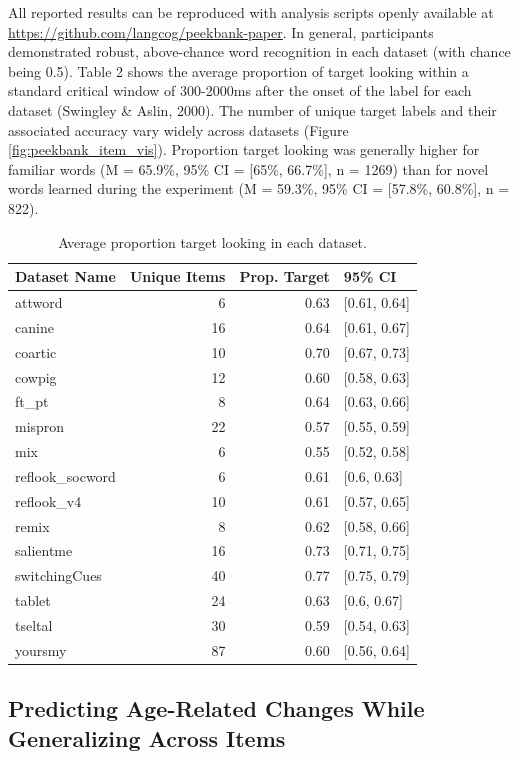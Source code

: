 \documentclass[10pt, letterpaper]{article}
\begin{document}
All reported results can be reproduced with analysis scripts openly
available at \url{https://github.com/langcog/peekbank-paper}. In
general, participants demonstrated robust, above-chance word recognition
in each dataset (with chance being 0.5). Table 2 shows the average
proportion of target looking within a standard critical window of
300-2000ms after the onset of the label for each dataset (Swingley \&
Aslin, 2000). The number of unique target labels and their associated
accuracy vary widely across datasets (Figure
\ref{fig:peekbank_item_vis}). Proportion target looking was generally
higher for familiar words (M = 65.9\%, 95\% CI = {[}65\%, 66.7\%{]}, n =
1269) than for novel words learned during the experiment (M = 59.3\%,
95\% CI = {[}57.8\%, 60.8\%{]}, n = 822).

\begin{table}[H]
\centering
\begingroup\fontsize{9pt}{10pt}\selectfont
\begin{tabular}{lrrl}
  \hline
Dataset Name & Unique Items & Prop. Target & 95\% CI \\ 
  \hline
attword & 6 & 0.63 & [0.61, 0.64] \\ 
  canine & 16 & 0.64 & [0.61, 0.67] \\ 
  coartic & 10 & 0.70 & [0.67, 0.73] \\ 
  cowpig & 12 & 0.60 & [0.58, 0.63] \\ 
  ft\_pt & 8 & 0.64 & [0.63, 0.66] \\ 
  mispron & 22 & 0.57 & [0.55, 0.59] \\ 
  mix & 6 & 0.55 & [0.52, 0.58] \\ 
  reflook\_socword & 6 & 0.61 & [0.6, 0.63] \\ 
  reflook\_v4 & 10 & 0.61 & [0.57, 0.65] \\ 
  remix & 8 & 0.62 & [0.58, 0.66] \\ 
  salientme & 16 & 0.73 & [0.71, 0.75] \\ 
  switchingCues & 40 & 0.77 & [0.75, 0.79] \\ 
  tablet & 24 & 0.63 & [0.6, 0.67] \\ 
  tseltal & 30 & 0.59 & [0.54, 0.63] \\ 
  yoursmy & 87 & 0.60 & [0.56, 0.64] \\ 
   \hline
\end{tabular}
\endgroup
\caption{Average proportion target looking in each dataset.} 
\end{table}

\hypertarget{predicting-age-related-changes-while-generalizing-across-items}{%
\subsection{Predicting Age-Related Changes While Generalizing Across
Items}\label{predicting-age-related-changes-while-generalizing-across-items}}
\end{document}
